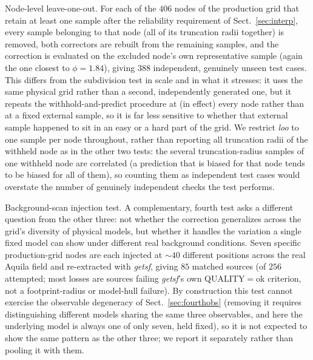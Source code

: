\documentclass{aa}
\begin{document}
Node-level leave-one-out. For each of the $406$ nodes of the
production grid that retain at least one sample after the reliability
requirement of Sect.~\ref{sec:interp}, every sample belonging to that node
(all of its truncation radii together) is removed, both correctors are
rebuilt from the remaining samples, and the correction is evaluated on the
excluded node's own representative sample (again the one closest to
$\phi=1.84$), giving $388$ independent, genuinely unseen test
cases. This differs from the subdivision test in scale and in what it
stresses: it uses the same physical grid rather than a second,
independently generated one, but it repeats the withhold-and-predict
procedure at (in effect) every node rather than at a fixed external
sample, so it is far less sensitive to whether that external sample
happened to sit in an easy or a hard part of the grid. We restrict \emph{loo} to
one sample per node throughout, rather than reporting all truncation
radii of the withheld node as in the other two tests: the several
truncation-radius samples of one withheld node are correlated (a
prediction that is biased for that node tends to be biased for all of
them), so counting them as independent test cases would overstate the
number of genuinely independent checks the test performs.

Background-scan injection test. A complementary, fourth test asks a
different question from the other three: not whether the correction
generalizes across the grid's diversity of physical models, but whether it
handles the variation a single fixed model can show under different real
background conditions. Seven specific production-grid nodes are each
injected at $\sim\!40$ different positions across the real Aquila field
and re-extracted with \emph{getsf}, giving $85$ matched sources (of $256$
attempted; most losses are sources failing \emph{getsf}'s own
QUALITY$=$ok criterion, not a footprint-radius or model-hull failure). By
construction this test cannot exercise the observable degeneracy of
Sect.~\ref{sec:fourthobs} (removing it requires distinguishing
different models sharing the same three observables, and here the
underlying model is always one of only seven, held fixed), so it is not
expected to show the same pattern as the other three; we report it
separately rather than pooling it with them.
\end{document}
